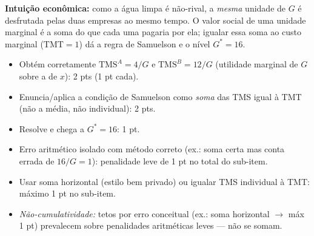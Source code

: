 \begin{solucao}
\textbf{Intui\c{c}\~ao econ\^omica:} como a \'agua limpa \'e n\~ao-rival, a \emph{mesma} unidade de $G$ \'e desfrutada pelas duas empresas ao mesmo tempo. O valor social de uma unidade marginal \'e a soma do que cada uma pagaria por ela; igualar essa soma ao custo marginal ($\text{TMT}=1$) d\'a a regra de Samuelson e o n\'ivel $G^{*}=16$.
\rubricalabel
\begin{itemize}\item Obt\'em corretamente $\text{TMS}^A=4/G$ e $\text{TMS}^B=12/G$ (utilidade marginal de $G$ sobre a de $x$): 2 pts (1 pt cada).\item Enuncia/aplica a condi\c{c}\~ao de Samuelson como \emph{soma} das TMS igual \`a TMT (n\~ao a m\'edia, n\~ao individual): 2 pts.\item Resolve e chega a $G^{*}=16$: 1 pt.\item Erro aritm\'etico isolado com m\'etodo correto (ex.: soma certa mas conta errada de $16/G=1$): penalidade leve de 1 pt no total do sub-item.\item Usar soma horizontal (estilo bem privado) ou igualar TMS individual \`a TMT: m\'aximo 1 pt no sub-item.\item \emph{N\~ao-cumulatividade:} tetos por erro conceitual (ex.: soma horizontal $\to$ m\'ax 1 pt) prevalecem sobre penalidades aritm\'eticas leves --- n\~ao se somam.\end{itemize}
\end{solucao}

